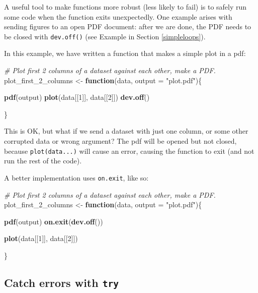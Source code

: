 \documentclass[]{book}
\newenvironment{Shaded}{\begin{snugshade}}{\end{snugshade}}
\newcommand{\CommentTok}[1]{\textcolor[rgb]{0.56,0.35,0.01}{\textit{#1}}}
\newcommand{\ControlFlowTok}[1]{\textcolor[rgb]{0.13,0.29,0.53}{\textbf{#1}}}
\newcommand{\DataTypeTok}[1]{\textcolor[rgb]{0.13,0.29,0.53}{#1}}
\newcommand{\DecValTok}[1]{\textcolor[rgb]{0.00,0.00,0.81}{#1}}
\newcommand{\KeywordTok}[1]{\textcolor[rgb]{0.13,0.29,0.53}{\textbf{#1}}}
\newcommand{\NormalTok}[1]{#1}
\newcommand{\StringTok}[1]{\textcolor[rgb]{0.31,0.60,0.02}{#1}}
\begin{document}
A useful tool to make functions more robust (less likely to fail) is to safely run some code when the function exits unexpectedly. One example arises with sending figures to an open PDF document: after we are done, the PDF needs to be closed with \texttt{dev.off()} (see Example in Section \ref{simpleloops}).

In this example, we have written a function that makes a simple plot in a pdf:

\begin{Shaded}
\begin{Highlighting}[]
\CommentTok{# Plot first 2 columns of a dataset against each other, make a PDF.}
\NormalTok{plot_first_}\DecValTok{2}\NormalTok{_columns <-}\StringTok{ }\ControlFlowTok{function}\NormalTok{(data, }\DataTypeTok{output =} \StringTok{"plot.pdf"}\NormalTok{)\{}
  
  \KeywordTok{pdf}\NormalTok{(output)}
  \KeywordTok{plot}\NormalTok{(data[[}\DecValTok{1}\NormalTok{]], data[[}\DecValTok{2}\NormalTok{]])}
  \KeywordTok{dev.off}\NormalTok{()}
  
\NormalTok{\}}
\end{Highlighting}
\end{Shaded}

This is OK, but what if we send a dataset with just one column, or some other corrupted data or wrong argument? The pdf will be opened but not closed, because \texttt{plot(data...)} will cause an error, causing the function to exit (and not run the rest of the code).

A better implementation uses \texttt{on.exit}, like so:

\begin{Shaded}
\begin{Highlighting}[]
\CommentTok{# Plot first 2 columns of a dataset against each other, make a PDF.}
\NormalTok{plot_first_}\DecValTok{2}\NormalTok{_columns <-}\StringTok{ }\ControlFlowTok{function}\NormalTok{(data, }\DataTypeTok{output =} \StringTok{"plot.pdf"}\NormalTok{)\{}
  
  \KeywordTok{pdf}\NormalTok{(output)}
  \KeywordTok{on.exit}\NormalTok{(}\KeywordTok{dev.off}\NormalTok{())}
  
  \KeywordTok{plot}\NormalTok{(data[[}\DecValTok{1}\NormalTok{]], data[[}\DecValTok{2}\NormalTok{]])}
  
\NormalTok{\}}
\end{Highlighting}
\end{Shaded}

\hypertarget{catch-errors-with-try}{%
\subsection{\texorpdfstring{Catch errors with \texttt{try}}{Catch errors with try}}\label{catch-errors-with-try}}
\end{document}

